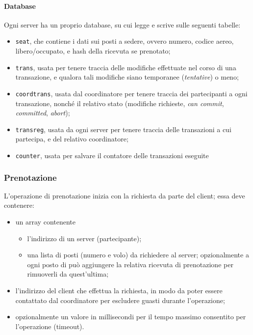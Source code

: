 \documentclass[a4paper]{article}
\begin{document}
\paragraph{Database}Ogni server ha un proprio database, su cui legge e scrive sulle seguenti tabelle:
\begin{itemize}
	\item \texttt{seat}, che contiene i dati sui posti a sedere, ovvero numero, codice aereo, libero/occupato, e hash della ricevuta se prenotato;
	\item \texttt{trans}, usata per tenere traccia delle modifiche effettuate nel corso di una transazione, e qualora tali modifiche siano temporanee (\textit{tentative}) o meno;
	\item \texttt{coordtrans}, usata dal coordinatore per tenere traccia dei partecipanti a ogni transazione, nonché il relativo stato (modifiche richieste, \textit{can commit}, \textit{committed}, \textit{abort});
	\item \texttt{transreg}, usata da ogni server per tenere traccia delle transazioni a cui partecipa, e del relativo coordinatore;
	\item \texttt{counter}, usata per salvare il contatore delle transazioni eseguite
\end{itemize}

\subsubsection{Prenotazione}
L'operazione di prenotazione inizia con la richiesta da parte del client; essa deve contenere:
\begin{itemize}
	\item un array contenente
	\begin{itemize}
		\item l'indirizzo di un server (partecipante);
		\item una lista di posti (numero e volo) da richiedere al server; opzionalmente a ogni posto di può aggiungere la relativa ricevuta di prenotazione per rimuoverli da quest'ultima;
	\end{itemize}
	\item l'indirizzo del client che effettua la richiesta, in modo da poter essere contattato dal coordinatore per escludere guasti durante l'operazione;
	\item opzionalmente un valore in millisecondi per il tempo massimo consentito per l'operazione (timeout).
\end{itemize}
\end{document}
